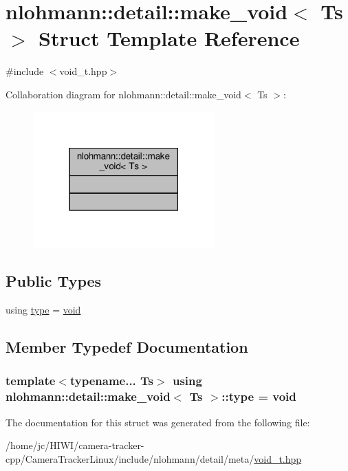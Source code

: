\hypertarget{structnlohmann_1_1detail_1_1make__void}{}\section{nlohmann\+:\+:detail\+:\+:make\+\_\+void$<$ Ts $>$ Struct Template Reference}
\label{structnlohmann_1_1detail_1_1make__void}


{\ttfamily \#include $<$void\+\_\+t.\+hpp$>$}



Collaboration diagram for nlohmann\+:\+:detail\+:\+:make\+\_\+void$<$ Ts $>$\+:\nopagebreak
\begin{figure}[H]
\begin{center}
\leavevmode
\includegraphics[width=198pt]{structnlohmann_1_1detail_1_1make__void__coll__graph}
\end{center}
\end{figure}
\subsection*{Public Types}
\begin{DoxyCompactItemize}
\item 
using \hyperlink{structnlohmann_1_1detail_1_1make__void_a8961e24ae3b2cb65ec47d1ce805d94e4}{type} = \hyperlink{namespacenlohmann_1_1detail_a59fca69799f6b9e366710cb9043aa77d}{void}
\end{DoxyCompactItemize}


\subsection{Member Typedef Documentation}
\subsubsection[{\texorpdfstring{type}{type}}]{\setlength{\rightskip}{0pt plus 5cm}template$<$typename... Ts$>$ using {\bf nlohmann\+::detail\+::make\+\_\+void}$<$ Ts $>$\+::{\bf type} =  {\bf void}}\hypertarget{structnlohmann_1_1detail_1_1make__void_a8961e24ae3b2cb65ec47d1ce805d94e4}{}\label{structnlohmann_1_1detail_1_1make__void_a8961e24ae3b2cb65ec47d1ce805d94e4}


The documentation for this struct was generated from the following file\+:\begin{DoxyCompactItemize}
\item 
/home/jc/\+H\+I\+W\+I/camera-\/tracker-\/cpp/\+Camera\+Tracker\+Linux/include/nlohmann/detail/meta/\hyperlink{void__t_8hpp}{void\+\_\+t.\+hpp}\end{DoxyCompactItemize}
